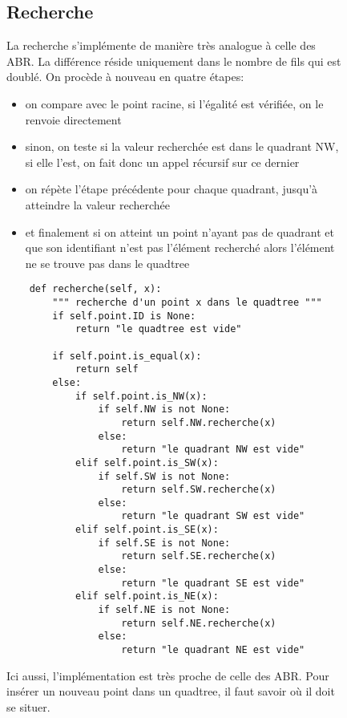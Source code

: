 \documentclass{report}
\begin{document}
\begin{figure}[h]
\subsection{Recherche}

La recherche s'implémente de manière très analogue à celle des ABR. La différence réside uniquement dans le nombre de fils qui est doublé. On procède à nouveau en quatre étapes:
\begin{itemize}
	\item on compare avec le point racine, si l'égalité est vérifiée, on le renvoie directement
	\item sinon, on teste si la valeur recherchée est dans le quadrant NW, si elle l'est, on fait donc un appel récursif sur ce dernier
	\item on répète l'étape précédente pour chaque quadrant, jusqu'à atteindre la valeur recherchée
	\item et finalement si on atteint un point n'ayant pas de quadrant et que son identifiant n'est pas l'élément recherché alors l'élément ne se trouve pas dans le quadtree
\end{itemize}

\begin{lstlisting}
    def recherche(self, x):
        """ recherche d'un point x dans le quadtree """
        if self.point.ID is None:
            return "le quadtree est vide"

        if self.point.is_equal(x):
            return self
        else:
            if self.point.is_NW(x):
                if self.NW is not None:
                    return self.NW.recherche(x)
                else:
                    return "le quadrant NW est vide"
            elif self.point.is_SW(x):
                if self.SW is not None:
                    return self.SW.recherche(x)
                else:
                    return "le quadrant SW est vide"
            elif self.point.is_SE(x):
                if self.SE is not None:
                    return self.SE.recherche(x)
                else:
                    return "le quadrant SE est vide"
            elif self.point.is_NE(x):
                if self.NE is not None:
                    return self.NE.recherche(x)
                else:
                    return "le quadrant NE est vide"
\end{lstlisting}


Ici aussi, l'implémentation est très proche de celle des ABR. Pour insérer un nouveau point dans un quadtree, il faut savoir où il doit se situer.  


\end{figure}
\end{document}
